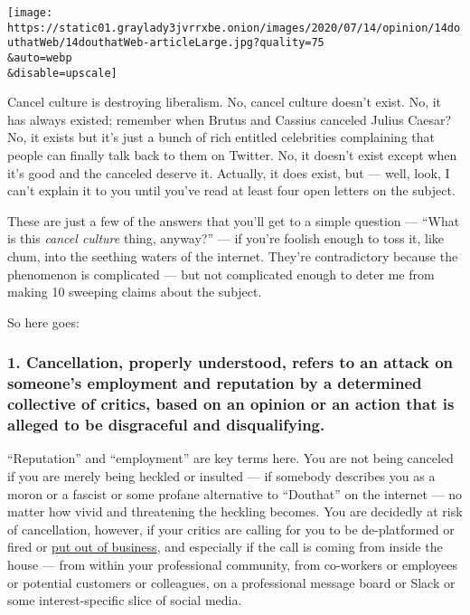 \texttt{[image: https://static01.graylady3jvrrxbe.onion/images/2020/07/14/opinion/14douthatWeb/14douthatWeb-articleLarge.jpg?quality=75\\\&auto=webp\\\&disable=upscale]}

Cancel culture is destroying liberalism. No, cancel culture doesn't
exist. No, it has always existed; remember when Brutus and Cassius
canceled Julius Caesar? No, it exists but it's just a bunch of rich
entitled celebrities complaining that people can finally talk back to
them on Twitter. No, it doesn't exist except when it's good and the
canceled deserve it. Actually, it does exist, but --- well, look, I
can't explain it to you until you've read at least four open letters on
the subject.

These are just a few of the answers that you'll get to a simple question
--- ``What is this \emph{cancel culture} thing, anyway?'' --- if you're
foolish enough to toss it, like chum, into the seething waters of the
internet. They're contradictory because the phenomenon is complicated
--- but not complicated enough to deter me from making 10 sweeping
claims about the subject.

So here goes:

\hypertarget{1-cancellation-properly-understood-refers-to-an-attack-on-someones-employment-and-reputation-by-a-determined-collective-of-critics-based-on-an-opinion-or-an-action-that-is-alleged-to-be-disgraceful-and-disqualifying}{%
\subsubsection{1. Cancellation, properly understood, refers to an attack
on someone's employment and reputation by a determined collective of
critics, based on an opinion or an action that is alleged to be
disgraceful and
disqualifying.}\label{1-cancellation-properly-understood-refers-to-an-attack-on-someones-employment-and-reputation-by-a-determined-collective-of-critics-based-on-an-opinion-or-an-action-that-is-alleged-to-be-disgraceful-and-disqualifying}}

``Reputation'' and ``employment'' are key terms here. You are not being
canceled if you are merely being heckled or insulted --- if somebody
describes you as a moron or a fascist or some profane alternative to
``Douthat'' on the internet --- no matter how vivid and threatening the
heckling becomes. You are decidedly at risk of cancellation, however, if
your critics are calling for you to be de-platformed or fired or
\href{https://coloradosun.com/2020/06/29/kindness-yoga-closure-during-black-lives-matter/}{put
out of business}, and especially if the call is coming from inside the
house --- from within your professional community, from co-workers or
employees or potential customers or colleagues, on a professional
message board or Slack or some interest-specific slice of social media.

